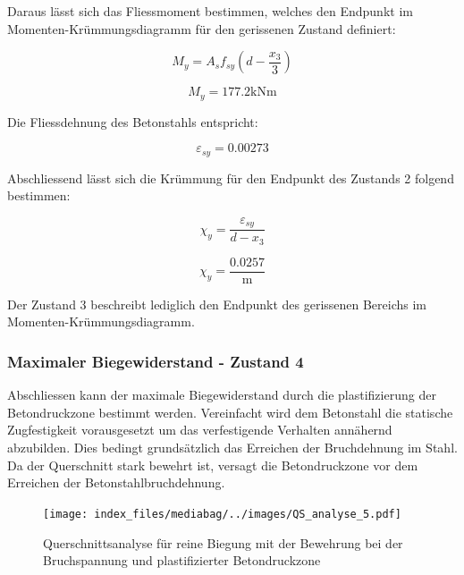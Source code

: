 \documentclass[
  letterpaper,
]{scrreprt}
\begin{document}
Daraus lässt sich das Fliessmoment bestimmen, welches den Endpunkt im
Momenten-Krümmungsdiagramm für den gerissenen Zustand definiert:

\begin{equation}M_{y} = A_{s} f_{sy} \left(d - \frac{x_{3}}{3}\right)\end{equation}

\begin{equation}M_{y} = 177.2 \text{kN} \text{m}\end{equation}

Die Fliessdehnung des Betonstahls entspricht:

\begin{equation}\varepsilon_{sy} = 0.00273\end{equation}

Abschliessend lässt sich die Krümmung für den Endpunkt des Zustands 2
folgend bestimmen:

\begin{equation}\chi_{y} = \frac{\varepsilon_{sy}}{d - x_{3}}\end{equation}

\begin{equation}\chi_{y} = \frac{0.0257}{\text{m}}\end{equation}

Der Zustand 3 beschreibt lediglich den Endpunkt des gerissenen Bereichs
im Momenten-Krümmungsdiagramm.

\hypertarget{maximaler-biegewiderstand---zustand-4}{%
\subsubsection{Maximaler Biegewiderstand - Zustand
4}\label{maximaler-biegewiderstand---zustand-4}}

Abschliessen kann der maximale Biegewiderstand durch die plastifizierung
der Betondruckzone bestimmt werden. Vereinfacht wird dem Betonstahl die
statische Zugfestigkeit vorausgesetzt um das verfestigende Verhalten
annähernd abzubilden. Dies bedingt grundsätzlich das Erreichen der
Bruchdehnung im Stahl. Da der Querschnitt stark bewehrt ist, versagt die
Betondruckzone vor dem Erreichen der Betonstahlbruchdehnung.

\begin{figure}[H]

{\centering \texttt{[image: index\_files/mediabag/../images/QS\_analyse\_5.pdf]}

}

\caption{\label{fig-qs5}Querschnittsanalyse für reine Biegung mit der
Bewehrung bei der Bruchspannung und plastifizierter Betondruckzone}

\end{figure}
\end{document}

